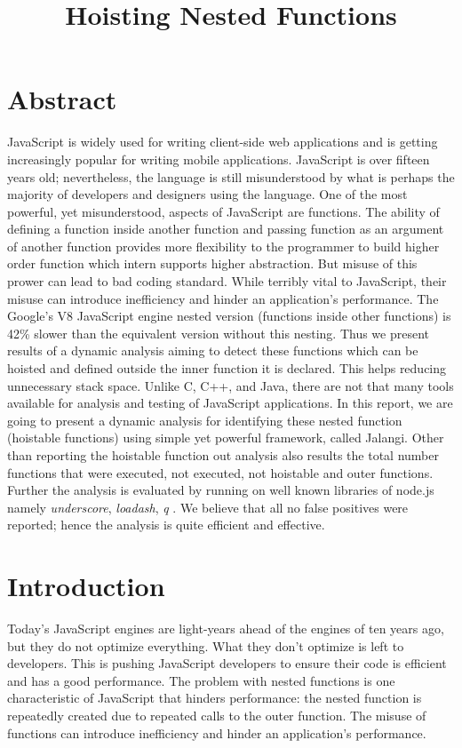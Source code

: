 \documentclass[accentcolor=tud0b,12pt,paper=a4]{tudreport}
\title{Hoisting Nested Functions}
\begin{document}
	\maketitle
	\tableofcontents 
	
\chapter{Abstract}
JavaScript is widely used for writing client-side web applications and is getting increasingly popular for writing mobile applications. JavaScript is over fifteen years old; nevertheless, the language is still misunderstood by what is perhaps the majority of developers and designers using the language. One of the most powerful, yet misunderstood, aspects of JavaScript are functions. The ability of defining a function inside another function and passing function as an argument of another function provides more flexibility to the programmer to build higher order function which intern supports higher abstraction. But misuse of this prower can lead to bad coding standard. While terribly vital to JavaScript, their misuse can introduce inefficiency and hinder an application's performance. The Google's V8 JavaScript engine nested version (functions inside
other functions) is 42\% slower than the equivalent version without this nesting. Thus we present results of a dynamic analysis aiming to detect these functions which can be hoisted and defined outside the inner function it is declared. This helps reducing unnecessary stack space. Unlike C, C++, and Java, there are not that many tools available for analysis and testing of JavaScript applications. In this report, we are going to present a dynamic analysis for identifying these nested function (hoistable functions) using simple yet powerful framework, called Jalangi. Other than reporting the hoistable function out analysis also results the total number functions that were executed, not executed, not hoistable and outer functions. Further the analysis is evaluated by running on well known libraries of node.js namely \emph{underscore}, \emph{loadash}, \emph{q} . We believe that all no false positives were reported; hence the analysis is quite efficient
and effective.

\chapter{Introduction}	
Today's JavaScript engines are light-years ahead of the engines of ten years ago, but they do not optimize everything. What they don't optimize is left to developers. This is pushing JavaScript developers to ensure their code is efficient and has a good performance. The problem with nested functions is one characteristic of JavaScript that hinders performance: the nested function is repeatedly created due to repeated calls to the outer function. The misuse of functions
can introduce inefficiency and hinder an application's performance.  
\end{document}
